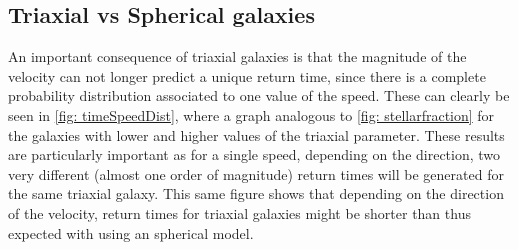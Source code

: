 	\subsection{Triaxial vs Spherical galaxies}
	An important consequence of triaxial galaxies is that the magnitude of the velocity can not longer predict a unique return time, since there is a complete probability distribution associated to one value of the speed. These can clearly be seen in \autoref{fig: timeSpeedDist}, where a graph analogous to \autoref{fig: stellarfraction} for the galaxies with lower and higher values of the triaxial parameter. These results are particularly important as for a single speed, depending on the direction, two very different (almost one order of magnitude) return times will be generated for the same triaxial galaxy. This same figure shows that depending on the direction of the velocity, return times for triaxial galaxies might be shorter than thus expected with using an spherical model.
